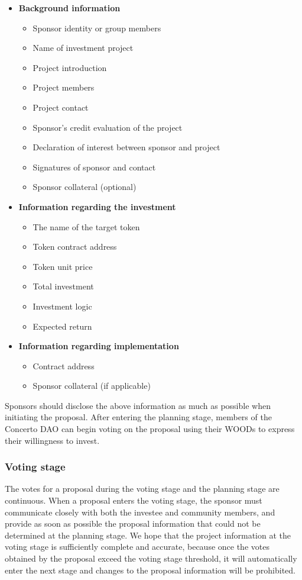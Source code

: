 \documentclass[UTF8]{article}
\begin{document}
\begin{multicols}{2}
\begin{itemize}
  \item \textbf{Background information}
    \begin{itemize}
    \item Sponsor identity or group members
    \item Name of investment project
    \item Project introduction
    \item Project members
    \item Project contact
    \item Sponsor's credit evaluation of the project
    \item Declaration of interest between sponsor and project
    \item Signatures of sponsor and contact
    \item Sponsor collateral (optional)
    \end{itemize}
  \item \textbf{Information regarding the investment}
    \begin{itemize}
    \item The name of the target token
    \item Token contract address
    \item Token unit price
    \item Total investment
    \item Investment logic
    \item Expected return
    \end{itemize}
  \item \textbf{Information regarding implementation}
    \begin{itemize}
    \item Contract address
    \item Sponsor collateral (if applicable)
    \end{itemize}
  \end{itemize}
  Sponsors should disclose the above information as much as possible when initiating the proposal. After entering the planning stage, members of the Concerto DAO can begin voting on the proposal using their WOODs to express their willingness to invest.

  \subsubsection{Voting stage}

  The votes for a proposal during the voting stage and the planning stage are continuous. When a proposal enters the voting stage, the sponsor must communicate closely with both the investee and community members, and provide as soon as possible the proposal information that could not be determined at the planning stage. We hope that the project information at the voting stage is sufficiently complete and accurate, because once the votes obtained by the proposal exceed the voting stage threshold, it will automatically enter the next stage and changes to the proposal information will be prohibited.


\end{multicols}
\end{document}
